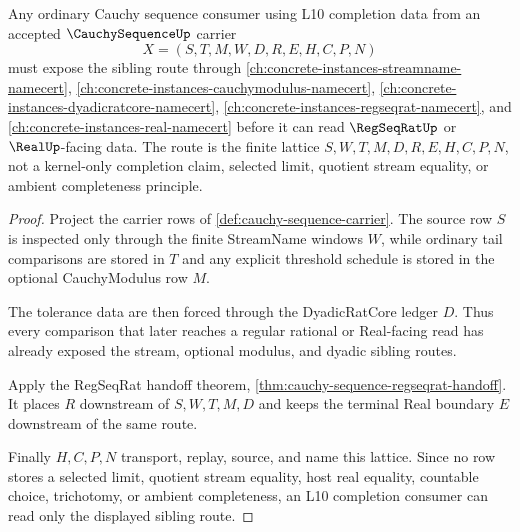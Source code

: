 \begin{theorem}
\label{thm:cauchy-sequence-l10-sibling-lattice}
Any ordinary Cauchy sequence consumer using L10 completion data from an accepted $\CauchySequenceUp$ carrier
$$
X=(S,T,M,W,D,R,E,H,C,P,N)
$$
must expose the sibling route through \autoref{ch:concrete-instances-streamname-namecert}, \autoref{ch:concrete-instances-cauchymodulus-namecert}, \autoref{ch:concrete-instances-dyadicratcore-namecert}, \autoref{ch:concrete-instances-regseqrat-namecert}, and \autoref{ch:concrete-instances-real-namecert} before it can read $\RegSeqRatUp$ or $\RealUp$-facing data. The route is the finite lattice $S,W,T,M,D,R,E,H,C,P,N$, not a kernel-only completion claim, selected limit, quotient stream equality, or ambient completeness principle.
\end{theorem}
\begin{proof}
Project the carrier rows of \autoref{def:cauchy-sequence-carrier}. The source row $S$ is inspected only through the finite StreamName windows $W$, while ordinary tail comparisons are stored in $T$ and any explicit threshold schedule is stored in the optional CauchyModulus row $M$.

The tolerance data are then forced through the DyadicRatCore ledger $D$. Thus every comparison that later reaches a regular rational or Real-facing read has already exposed the stream, optional modulus, and dyadic sibling routes.

Apply the RegSeqRat handoff theorem, \autoref{thm:cauchy-sequence-regseqrat-handoff}. It places $R$ downstream of $S,W,T,M,D$ and keeps the terminal Real boundary $E$ downstream of the same route.

Finally $H,C,P,N$ transport, replay, source, and name this lattice. Since no row stores a selected limit, quotient stream equality, host real equality, countable choice, trichotomy, or ambient completeness, an L10 completion consumer can read only the displayed sibling route.
\end{proof}

